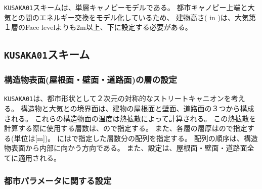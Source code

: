 \verb|KUSAKA01|スキームは、単層キャノピーモデルである。
都市キャノピー上端と大気との間のエネルギー交換をモデル化しているため、
建物高さ( in )は、大気第１層のFace levelよりも2m以上、下に設定する必要がある。


\subsection{\texttt{KUSAKA01}スキーム}
\subsubsection{構造物表面(屋根面・壁面・道路面)の層の設定}

\verb|KUSAKA01|は、都市形状として２次元の対称的なストリートキャニオンを考える。
構造物と大気との境界面は、建物の屋根面と壁面、道路面の３つから構成される。
これらの構造物面の温度は熱拡散によって計算される。
この熱拡散を計算する際に使用する層数は、ので指定する。
また、各層の層厚はので指定する(単位は[m])。
にはで指定した層数分の配列を指定する。
配列の順序は、構造物表面から内部に向かう方向である。
また、設定は、屋根面・壁面・道路面全てに適用される。


\subsubsection{都市パラメータに関する設定}

